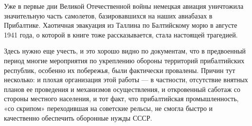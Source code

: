Уже в первые дни Великой Отечественной войны немецкая авиация уничтожила
значительную часть самолетов, базировавшихся на наших авиабазах в Прибалтике.
Хаотичная эвакуация из Таллина по Балтийскому морю в августе 1941 года, о
которой в книге тоже рассказывается, стала настоящей трагедией.


Здесь нужно еще учесть, и это хорошо видно по документам, что в предвоенный
период многие мероприятия по укреплению обороны территорий прибалтийских
республик, особенно их побережья, были фактически провалены. Причин тут
несколько: и плохая организация этой работы — в частности, отсутствие внятных
планов ее проведения и механизмов осуществления, и откровенный саботаж со
стороны местного населения, и тот факт, что прибалтийская промышленность, «со
скрипом» переходившая на советские рельсы, не смогла быстро и качественно
обеспечить оборонные нужды СССР.

